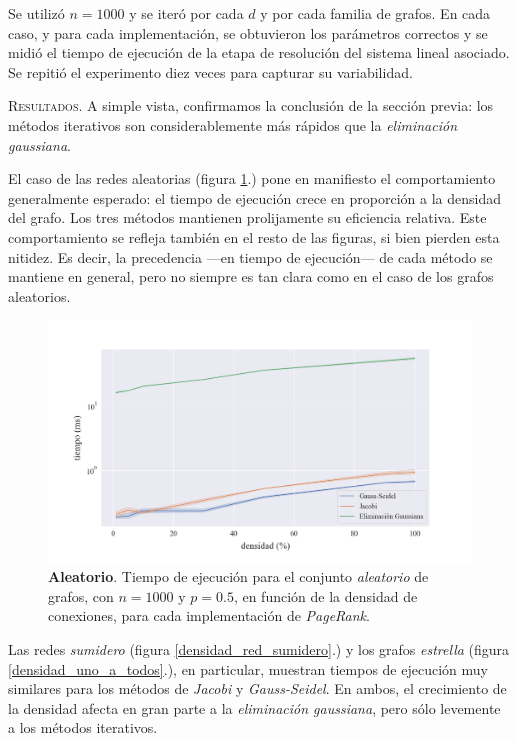 Se utilizó $n = 1000$ y se iteró por cada $d$ y por cada familia de grafos. En cada caso, y para cada implementación, se obtuvieron los parámetros correctos y se midió el tiempo de ejecución de la etapa de resolución del sistema lineal asociado. Se repitió el experimento diez veces para capturar su variabilidad.

\vspace{1.5em}
\noindent\textsc{Resultados}. A simple vista, confirmamos la conclusión de la sección previa: los métodos iterativos son considerablemente más rápidos que la \textit{eliminación gaussiana}.

\vspace{1em}
El caso de las redes aleatorias (figura \ref{densidad_aleatorio}.) pone en manifiesto el comportamiento generalmente esperado: 
el tiempo de ejecución crece en proporción a la densidad del grafo. Los tres métodos mantienen prolijamente su eficiencia relativa.
Este comportamiento se refleja también en el resto de las figuras, si bien pierden esta nitidez.
Es decir, la precedencia ---en tiempo de ejecución--- de cada método se mantiene en general, pero no siempre es tan clara como en el caso de los grafos aleatorios.

\begin{figure}[!htbp]
    \centering
    \includegraphics[width=.9\textwidth, trim=0 0 0 30]{files/src/.media/densidad_aleatorio.png}
    \caption{\textbf{Aleatorio}. Tiempo de ejecución para el conjunto \textit{aleatorio} de grafos, con $n = 1000$ y $p = 0.5$, en función de la densidad de conexiones, para cada implementación de \textit{PageRank}.}
    \label{densidad_aleatorio}
\end{figure}

\vspace{1em}
Las redes \textit{sumidero} (figura \ref{densidad_red_sumidero}.) y los grafos \textit{estrella} (figura \ref{densidad_uno_a_todos}.), en particular,
muestran tiempos de ejecución muy similares para los métodos de \textit{Jacobi} y \textit{Gauss-Seidel}.
En ambos, el crecimiento de la densidad afecta en gran parte a la \textit{eliminación gaussiana}, pero sólo levemente a los métodos iterativos.

